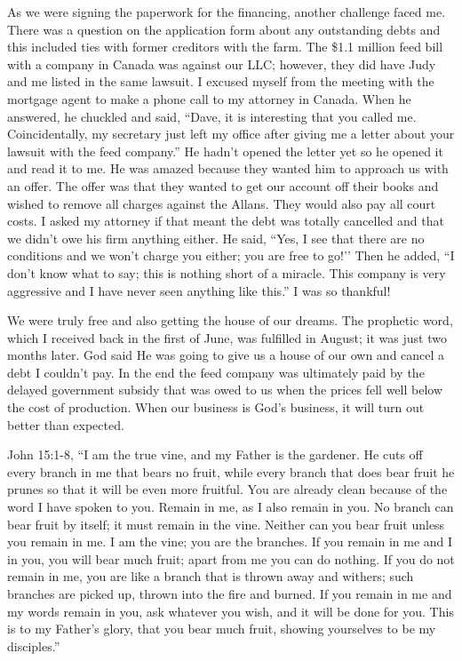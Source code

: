 \documentclass[oneside]{book}
\begin{document}
As we were signing the paperwork for the financing, another challenge faced me. There was a question on the application form about any outstanding debts and this included ties with former creditors with the farm. The \$1.1 million feed bill with a company in Canada was against our LLC; however, they did have Judy and me listed in the same lawsuit. I excused myself from the meeting with the mortgage agent to make a phone call to my attorney in Canada. When he answered, he chuckled and said, “Dave, it is interesting that you called me. Coincidentally, my secretary just left my office after giving me a letter about your lawsuit with the feed company.” He hadn’t opened the letter yet so he opened it and read it to me. He was amazed because they wanted him to approach us with an offer. The offer was that they wanted to get our account off their books and wished to remove all charges against the Allans. They would also pay all court costs. I asked my attorney if that meant the debt was totally cancelled and that we didn’t owe his firm anything either. He said, “Yes, I see that there are no conditions and we won’t charge you either; you are free to go!’’ Then he added, “I don’t know what to say; this is nothing short of a miracle. This company is very aggressive and I have never seen anything like this.” I was so thankful!

We were truly free and also getting the house of our dreams. The prophetic word, which I received back in the first of June, was fulfilled in August; it was just two months later. God said He was going to give us a house of our own and cancel a debt I couldn’t pay. In the end the feed company was ultimately paid by the delayed government subsidy that was owed to us when the prices fell well below the cost of production. When our business is God’s business, it will turn out better than expected. 

John 15:1-8,  “I am the true vine, and my Father is the gardener. He cuts off every branch in me that bears no fruit, while every branch that does bear fruit he prunes so that it will be even more fruitful. You are already clean because of the word I have spoken to you. Remain in me, as I also remain in you. No branch can bear fruit by itself; it must remain in the vine. Neither can you bear fruit unless you remain in me. I am the vine; you are the branches. If you remain in me and I in you, you will bear much fruit; apart from me you can do nothing. If you do not remain in me, you are like a branch that is thrown away and withers; such branches are picked up, thrown into the fire and burned. If you remain in me and my words remain in you, ask whatever you wish, and it will be done for you. This is to my Father’s glory, that you bear much fruit, showing yourselves to be my disciples.”
\end{document}
